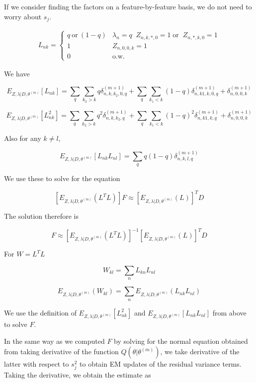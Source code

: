 \documentclass[11pt,authoryear]{article}
\begin{document}
If we consider finding the factors on a feature-by-feature basis, we do not need to worry about $s_j$.

\begin{align*}
L_{nk} =
\begin{cases}
    q~\text{or}~(1-q) & \lambda_{n}=q  \; \; Z_{n,k,*, 0}=1 \; \text{or} \;\; Z_{n, *, k, 0} = 1 \\
    1 & Z_{n,0,0,k}=1 \\
    0 & \text{o.w.}
\end{cases}
\end{align*}

We have 

$$ E_{ Z, \lambda | D, \theta^{(m)}} \left [ L_{nk} \right ] = \sum_{q}  \sum_{k_2 > k} q \delta^{(m+1)}_{n, k, k_2, 0, q}  + \sum_{q}  \sum_{k_1 < k} (1-q) \delta^{(m+1)}_{n, k1, k, 0, q} +  \delta^{(m+1)}_{n, 0, 0, k} $$

$$ E_{ Z, \lambda | D, \theta^{(m)}} \left [ L^2_{nk} \right ] = \sum_{q}  \sum_{k_2 > k} q^2 \delta^{(m+1)}_{n,k,k_2, q}  + \sum_{q}  \sum_{k_1 < k} (1-q)^2 \delta^{(m+1)}_{n,k1,k,q} +  \delta^{(m+1)}_{n, 0, 0, k} $$

Also for any $k \neq l$,

$$ E_{ Z, \lambda | D, \theta^{(m)}} \left [ L_{nk}L_{nl} \right ] =
\sum_{q} q(1-q) \delta^{(m+1)}_{n,k,l,q} $$

We use these to solve for the equation

$$ \left [ E_{ Z, \lambda | D, \theta^{(m)}} \left( L^{T}L \right ) \right ] F \approx \left [ E_{ Z, \lambda | D, \theta^{(m)}} (L) \right] ^{T} D $$

The solution therefore is 

$$ F \approx \left [ E_{ Z, \lambda | D, \theta^{(m)}} \left( L^{T}L \right ) \right]^{-1} \left [ E_{ Z, \lambda | D, \theta^{(m)}} (L) \right]^{T} D $$

For $W = L^{T}L$

$$ W_{kl} = \sum_{n} L_{kn}L_{nl} $$

$$ E_{ Z, \lambda | D, \theta^{(m)}} \left ( W_{kl} \right ) = \sum_{n}  E_{ Z, \lambda | D, \theta^{(m)}} \left ( L_{nk}L_{nl} \right) $$

We use the definition of $E_{ Z, \lambda | D, \theta^{(m)}} \left [ L^2_{nk} \right ]$ 
and $E_{ Z, \lambda | D, \theta^{(m)}} \left [ L_{nk}L_{nl} \right ]$ 
from above to solve $F$. 

In the same way as we computed $F$ by solving for the normal equation obtained from taking derivative of the function $Q (\theta | \theta^{(m)})$, we take derivative of the latter with respect to $s^2_{j}$ to obtain EM updates of the residual variance terms. Taking the derivative, we obtain the estimate as 
\end{document}
